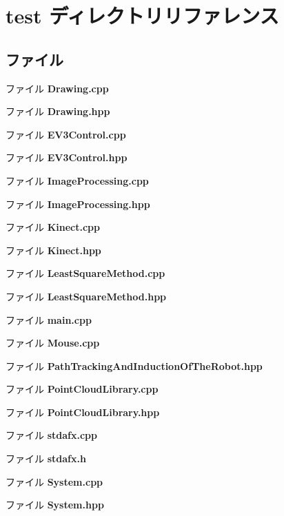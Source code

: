 \section{test ディレクトリリファレンス}
\label{dir_1ba24d86c0986604341e243b7dac5f64}
\subsection*{ファイル}
\begin{DoxyCompactItemize}
\item 
ファイル {\bf Drawing.\-cpp}
\item 
ファイル {\bf Drawing.\-hpp}
\item 
ファイル {\bf E\-V3\-Control.\-cpp}
\item 
ファイル {\bf E\-V3\-Control.\-hpp}
\item 
ファイル {\bf Image\-Processing.\-cpp}
\item 
ファイル {\bf Image\-Processing.\-hpp}
\item 
ファイル {\bf Kinect.\-cpp}
\item 
ファイル {\bf Kinect.\-hpp}
\item 
ファイル {\bf Least\-Square\-Method.\-cpp}
\item 
ファイル {\bf Least\-Square\-Method.\-hpp}
\item 
ファイル {\bf main.\-cpp}
\item 
ファイル {\bf Mouse.\-cpp}
\item 
ファイル {\bf Path\-Tracking\-And\-Induction\-Of\-The\-Robot.\-hpp}
\item 
ファイル {\bf Point\-Cloud\-Library.\-cpp}
\item 
ファイル {\bf Point\-Cloud\-Library.\-hpp}
\item 
ファイル {\bf stdafx.\-cpp}
\item 
ファイル {\bf stdafx.\-h}
\item 
ファイル {\bf System.\-cpp}
\item 
ファイル {\bf System.\-hpp}
\end{DoxyCompactItemize}

